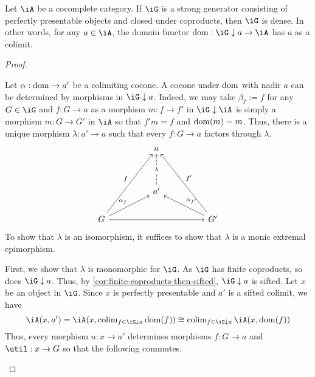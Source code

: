\documentclass{zett}
\begin{document}
\begin{lem}\label{lem:strong-generators-perfect-dense}
  Let $\iA$ be a cocomplete category.
  If $\iG$ is a strong generator consisting of perfectly presentable objects and closed under coproducts, then $\iG$ is dense.
  In other words, for any $a \in \iA$, the domain functor $\dom : \iG \dn a \to \iA$ has $a$ as a colimit.
\end{lem}
\begin{proof}
  \begin{node}
    Let $\alpha : \operatorname{dom} \to a'$ be a colimiting cocone.
    A cocone under $\operatorname{dom}$ with nadir $a$ can be determined by morphisms in $\iG \dn a$.
    Indeed, we may take $\beta_{f} := f$ for any $G \in \iG$ and $f : G \to a$ as a morphism $m : f \to f'$ in $\iG \dn \iA$ is simply a morphism $m : G \to G'$ in $\iA$ so that $f'm = f$ and $\operatorname{dom}(m) = m$.
    Thus, there is a unique morphism $\lambda : a' \to a$ such that every $f : G \to a$ factors through $\lambda$.
    \[\begin{tikzcd}
	&& a \\
	\\
	&& {a'} \\
	G &&&& {G'}
	\arrow["{\alpha_{f}}", from=4-1, to=3-3]
	\arrow["{\alpha_{f'}}"', from=4-5, to=3-3]
	\arrow["f", from=4-1, to=1-3]
	\arrow["{f'}"', from=4-5, to=1-3]
	\arrow[from=4-1, to=4-5]
	\arrow["\lambda"{description}, dashed, from=3-3, to=1-3]
      \end{tikzcd}\]
    To show that $\lambda$ is an isomorphism, it suffices to show that $\lambda$ is a monic extremal epimorphism.
  \end{node}
  \begin{node}
    First, we show that $\lambda$ is monomorphic for $\iG$.
    As $\iG$ has finite coproducts, so does $\iG \dn a$.
    Thus, by \cref{cor:finite-coproducts-then-sifted}, $\iG \dn a$ is sifted.
    Let $x$ be an object in $\iG$.
    Since $x$ is perfectly presentable and $a'$ is a sifted colimit, we have
    \[
      \iA(x, a') = \iA(x, \colim_{f \in \iG \dn a}\dom(f)) \iso \colim_{f \in \iG \dn a}\iA(x, \dom(f))
    \]
    Thus, every morphism $u : x \to a'$ determines morphisms $f : G \to a$ and $\util : x \to G$ so that the following commutes.

\end{node}
\end{proof}
\end{document}
